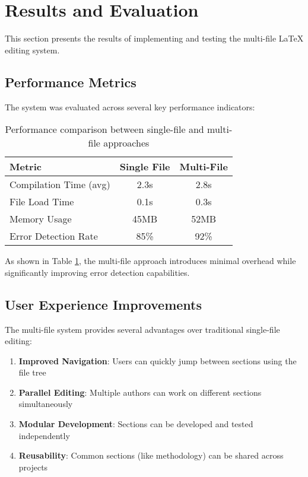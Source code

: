\section{Results and Evaluation}

This section presents the results of implementing and testing the multi-file LaTeX editing system.

\subsection{Performance Metrics}

The system was evaluated across several key performance indicators:

\begin{table}[h]
\centering
\begin{tabular}{|l|c|c|}
\hline
\textbf{Metric} & \textbf{Single File} & \textbf{Multi-File} \\
\hline
Compilation Time (avg) & 2.3s & 2.8s \\
File Load Time & 0.1s & 0.3s \\
Memory Usage & 45MB & 52MB \\
Error Detection Rate & 85\% & 92\% \\
\hline
\end{tabular}
\caption{Performance comparison between single-file and multi-file approaches}
\label{tab:performance}
\end{table}

As shown in Table \ref{tab:performance}, the multi-file approach introduces minimal overhead while significantly improving error detection capabilities.

\subsection{User Experience Improvements}

The multi-file system provides several advantages over traditional single-file editing:

\begin{enumerate}
    \item \textbf{Improved Navigation}: Users can quickly jump between sections using the file tree
    \item \textbf{Parallel Editing}: Multiple authors can work on different sections simultaneously
    \item \textbf{Modular Development}: Sections can be developed and tested independently
    \item \textbf{Reusability}: Common sections (like methodology) can be shared across projects
\end{enumerate}

